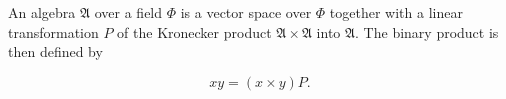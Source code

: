 An algebra $\mathfrak{A}$ over a field $\Phi$ is a vector space over $\Phi$ together with a linear transformation $P$ of the Kronecker product $\mathfrak{A} \times \mathfrak{A}$ into $\mathfrak{A}$. The binary product is then defined by

$$xy = (x \times y)P.$$

